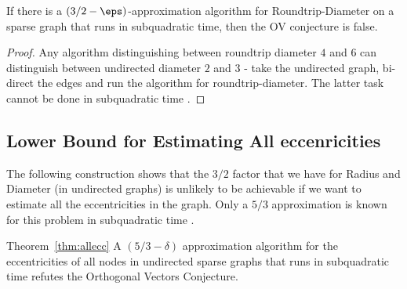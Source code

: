 \begin{lemma}
\label{lem:RoundDiam}
If there is a $(3/2-\eps)$-approximation algorithm for Roundtrip-Diameter on a sparse graph that runs in subquadratic time, then the OV conjecture is false.
\end{lemma}

\begin{proof}
Any algorithm distinguishing between roundtrip diameter $4$ and $6$ can distinguish between undirected diameter $2$ and $3$ - take the undirected graph, bi-direct the edges and run the algorithm for roundtrip-diameter.
The latter task cannot be done in subquadratic time \cite{RV13}.
\end{proof}







\subsection{Lower Bound for Estimating All eccenricities}


The following construction shows that the $3/2$ factor that we have for Radius and Diameter (in undirected graphs) is unlikely to be achievable if we want to estimate all the eccentricities in the graph. 
Only a $5/3$ approximation is known for this problem in subquadratic time \cite{diametersoda14}.

\begin{reminder}{Theorem~\ref{thm:allecc}}
 A $(5/3-\delta)$ approximation algorithm for the eccentricities of all nodes in undirected sparse graphs that runs in subquadratic time refutes the Orthogonal Vectors Conjecture.
\end{reminder}

